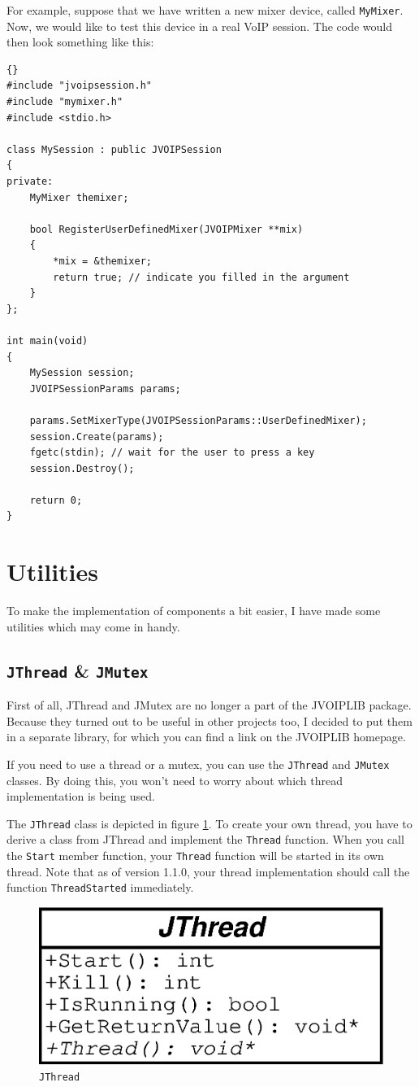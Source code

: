 	For example, suppose that we have written a new mixer device, called {\tt MyMixer}.
	Now, we would like to test this device in a real VoIP session. The code would then
	look something like this:
	\begin{lstlisting}[frame=tb]{}
#include "jvoipsession.h"
#include "mymixer.h"
#include <stdio.h>

class MySession : public JVOIPSession
{
private:
	MyMixer themixer;

	bool RegisterUserDefinedMixer(JVOIPMixer **mix)
	{
		*mix = &themixer;
		return true; // indicate you filled in the argument
	}
};

int main(void)
{
	MySession session;
	JVOIPSessionParams params;

	params.SetMixerType(JVOIPSessionParams::UserDefinedMixer);
	session.Create(params);
	fgetc(stdin); // wait for the user to press a key
	session.Destroy();

	return 0;
}
\end{lstlisting}

	\section{Utilities}
	
	To make the implementation of components a bit easier, I have made
	some utilities which may come in handy.
	
		\subsection{{\tt JThread} \& {\tt JMutex}}
		
		First of all, JThread and JMutex are no longer a part of the JVOIPLIB
		package. Because they turned out to be useful in other projects too,
		I decided to put them in a separate library, for which you can find
		a link on the JVOIPLIB homepage.
		
		If you need to use a thread or a mutex, you can use the {\tt JThread}
		and {\tt JMutex} classes. By doing this, you won't need to worry about
		which thread implementation is being used.
		
		The {\tt JThread} class is depicted in figure \ref{class-jthread}. To
		create your own thread, you have to derive a class from JThread and
		implement the {\tt Thread} function. When you call the {\tt Start}
		member function, your {\tt Thread} function will be started in its
		own thread. Note that as of version 1.1.0, your thread implementation
		should call the function {\tt ThreadStarted} immediately.
		\begin{figure}
			\center
			\includegraphics[width=0.35\linewidth]{images/manual/chapter4/class-jthread.eps}
			\caption{\tt JThread}
			\label{class-jthread}
		\end{figure}
		
